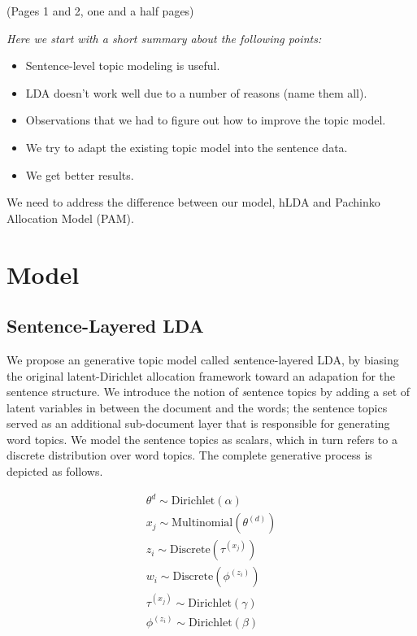 (Pages 1 and 2, one and a half pages) { \it Here we start with a short summary
about the following points: \begin{itemize} \item Sentence-level topic modeling
is useful.  \item LDA doesn't work well due to a number of reasons (name them
all).  \item Observations that we had to figure out how to improve the topic
model.  \item We try to adapt the existing topic model into the sentence data.
\item We get better results.  \end{itemize} We need to address the difference
between our model, hLDA and Pachinko Allocation Model (PAM). }

\section{Model}
\subsection{Sentence-Layered LDA}

We propose an generative topic model called {\emph sentence-layered LDA}, by
biasing the original latent-Dirichlet allocation framework toward an adapation
{for} the sentence structure.  We introduce the notion of {\emph sentence
topics} by adding a set of latent variables in between the document and the
words; the sentence topics served as an additional sub-document layer that is
responsible for generating word topics.  We model the sentence topics as
scalars, which in turn refers to a discrete distribution over word topics.  The
complete generative process is depicted as follows.

\begin{eqnarray*}
  \theta^{d} \sim \mathrm{Dirichlet}(\alpha) \\
  x_j \sim \mathrm{Multinomial}(\theta^{(d)}) \\
  z_i \sim \mathrm{Discrete}(\tau^{(x_j)}) \\
  w_i \sim \mathrm{Discrete}(\phi^{(z_i)}) \\
  \tau^{(x_j)} \sim \mathrm{Dirichlet}(\gamma) \\
  \phi^{(z_i)} \sim \mathrm{Dirichlet}(\beta) 
\end{eqnarray*}

